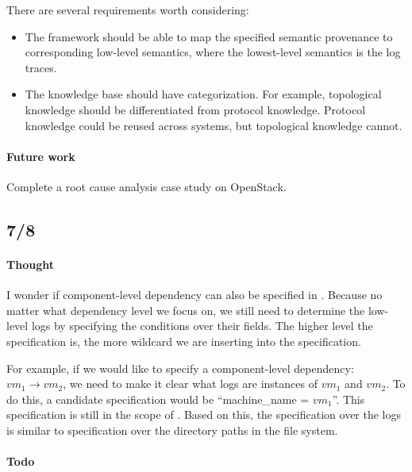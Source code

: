 \documentclass{article}
\begin{document}
\begin{itemize}
  There are several requirements worth considering:
  \begin{itemize}
  \item The framework should be able to map the specified semantic provenance to
    corresponding low-level semantics, where the lowest-level semantics is the
    log traces. 
  
  \item The knowledge base should have categorization. For example, topological
    knowledge should be differentiated from protocol knowledge. Protocol
    knowledge could be reused across systems, but topological knowledge cannot.

  \end{itemize}

\end{itemize}

\paragraph{Future work}
Complete a root cause analysis case study on OpenStack.

\subsection{7/8}
\label{sec:meeting:678}

\paragraph{Thought}
I wonder if component-level dependency can also be specified in \saf{}. Because no
matter what dependency level we focus on, we still need to determine the
low-level logs by specifying the conditions over their fields. The higher level the
specification is, the more wildcard we are inserting into the specification.

For example, if we would like to specify a component-level dependency: $vm_1
\rightarrow vm_2$, we need to make it clear what logs are instances of $vm_1$
and $vm_2$. To do this, a candidate specification would be ``machine\_name =
$vm_1$''. This specification is still in the scope of \saf{}. Based on this, the
specification over the logs is similar to specification over the directory paths
in the file system.

\paragraph{Todo}
\end{document}
